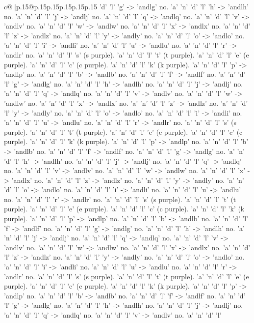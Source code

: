 \documentclass{article}
\begin{document}
{\begin{supertabular}{c@{$\;$}|p{.15\linewidth}@{}p{.15\linewidth}p{.15\linewidth}p{.15\linewidth}p{.15\linewidth}p{.15\linewidth}}
{{{'d' 'l' 'g' {-}> 'andlg' no. 'a' 'n' 'd' 'l' 'h' {-}> 'andlh' no. 'a' 'n' 'd' 'l' 'j' {-}> 'andlj' no. 'a' 'n' 'd' 'l' 'q' {-}> 'andlq' no. 'a' 'n' 'd' 'l' 'v' {-}> 'andlv' no. 'a' 'n' 'd' 'l' 'w' {-}> 'andlw' no. 'a' 'n' 'd' 'l' 'x' {-}> 'andlx' no. 'a' 'n' 'd' 'l' 'z' {-}> 'andlz' no. 'a' 'n' 'd' 'l' 'y' {-}> 'andly' no. 'a' 'n' 'd' 'l' 'o' {-}> 'andlo' no. 'a' 'n' 'd' 'l' 'i' {-}> 'andli' no. 'a' 'n' 'd' 'l' 'u' {-}> 'andlu' no. 'a' 'n' 'd' 'l' 'r' {-}> 'andlr' no. 'a' 'n' 'd' 'l' 's' (s purple). 'a' 'n' 'd' 'l' 't' (t purple). 'a' 'n' 'd' 'l' 'e' (e purple). 'a' 'n' 'd' 'l' 'c' (c purple). 'a' 'n' 'd' 'l' 'k' (k purple). 'a' 'n' 'd' 'l' 'p' {-}> 'andlp' no. 'a' 'n' 'd' 'l' 'b' {-}> 'andlb' no. 'a' 'n' 'd' 'l' 'f' {-}> 'andlf' no. 'a' 'n' 'd' 'l' 'g' {-}> 'andlg' no. 'a' 'n' 'd' 'l' 'h' {-}> 'andlh' no. 'a' 'n' 'd' 'l' 'j' {-}> 'andlj' no. 'a' 'n' 'd' 'l' 'q' {-}> 'andlq' no. 'a' 'n' 'd' 'l' 'v' {-}> 'andlv' no. 'a' 'n' 'd' 'l' 'w' {-}> 'andlw' no. 'a' 'n' 'd' 'l' 'x' {-}> 'andlx' no. 'a' 'n' 'd' 'l' 'z' {-}> 'andlz' no. 'a' 'n' 'd' 'l' 'y' {-}> 'andly' no. 'a' 'n' 'd' 'l' 'o' {-}> 'andlo' no. 'a' 'n' 'd' 'l' 'i' {-}> 'andli' no. 'a' 'n' 'd' 'l' 'u' {-}> 'andlu' no. 'a' 'n' 'd' 'l' 'r' {-}> 'andlr' no. 'a' 'n' 'd' 'l' 's' (s purple). 'a' 'n' 'd' 'l' 't' (t purple). 'a' 'n' 'd' 'l' 'e' (e purple). 'a' 'n' 'd' 'l' 'c' (c purple). 'a' 'n' 'd' 'l' 'k' (k purple). 'a' 'n' 'd' 'l' 'p' {-}> 'andlp' no. 'a' 'n' 'd' 'l' 'b' {-}> 'andlb' no. 'a' 'n' 'd' 'l' 'f' {-}> 'andlf' no. 'a' 'n' 'd' 'l' 'g' {-}> 'andlg' no. 'a' 'n' 'd' 'l' 'h' {-}> 'andlh' no. 'a' 'n' 'd' 'l' 'j' {-}> 'andlj' no. 'a' 'n' 'd' 'l' 'q' {-}> 'andlq' no. 'a' 'n' 'd' 'l' 'v' {-}> 'andlv' no. 'a' 'n' 'd' 'l' 'w' {-}> 'andlw' no. 'a' 'n' 'd' 'l' 'x' {-}> 'andlx' no. 'a' 'n' 'd' 'l' 'z' {-}> 'andlz' no. 'a' 'n' 'd' 'l' 'y' {-}> 'andly' no. 'a' 'n' 'd' 'l' 'o' {-}> 'andlo' no. 'a' 'n' 'd' 'l' 'i' {-}> 'andli' no. 'a' 'n' 'd' 'l' 'u' {-}> 'andlu' no. 'a' 'n' 'd' 'l' 'r' {-}> 'andlr' no. 'a' 'n' 'd' 'l' 's' (s purple). 'a' 'n' 'd' 'l' 't' (t purple). 'a' 'n' 'd' 'l' 'e' (e purple). 'a' 'n' 'd' 'l' 'c' (c purple). 'a' 'n' 'd' 'l' 'k' (k purple). 'a' 'n' 'd' 'l' 'p' {-}> 'andlp' no. 'a' 'n' 'd' 'l' 'b' {-}> 'andlb' no. 'a' 'n' 'd' 'l' 'f' {-}> 'andlf' no. 'a' 'n' 'd' 'l' 'g' {-}> 'andlg' no. 'a' 'n' 'd' 'l' 'h' {-}> 'andlh' no. 'a' 'n' 'd' 'l' 'j' {-}> 'andlj' no. 'a' 'n' 'd' 'l' 'q' {-}> 'andlq' no. 'a' 'n' 'd' 'l' 'v' {-}> 'andlv' no. 'a' 'n' 'd' 'l' 'w' {-}> 'andlw' no. 'a' 'n' 'd' 'l' 'x' {-}> 'andlx' no. 'a' 'n' 'd' 'l' 'z' {-}> 'andlz' no. 'a' 'n' 'd' 'l' 'y' {-}> 'andly' no. 'a' 'n' 'd' 'l' 'o' {-}> 'andlo' no. 'a' 'n' 'd' 'l' 'i' {-}> 'andli' no. 'a' 'n' 'd' 'l' 'u' {-}> 'andlu' no. 'a' 'n' 'd' 'l' 'r' {-}> 'andlr' no. 'a' 'n' 'd' 'l' 's' (s purple). 'a' 'n' 'd' 'l' 't' (t purple). 'a' 'n' 'd' 'l' 'e' (e purple). 'a' 'n' 'd' 'l' 'c' (c purple). 'a' 'n' 'd' 'l' 'k' (k purple). 'a' 'n' 'd' 'l' 'p' {-}> 'andlp' no. 'a' 'n' 'd' 'l' 'b' {-}> 'andlb' no. 'a' 'n' 'd' 'l' 'f' {-}> 'andlf' no. 'a' 'n' 'd' 'l' 'g' {-}> 'andlg' no. 'a' 'n' 'd' 'l' 'h' {-}> 'andlh' no. 'a' 'n' 'd' 'l' 'j' {-}> 'andlj' no. 'a' 'n' 'd' 'l' 'q' {-}> 'andlq' no. 'a' 'n' 'd' 'l' 'v' {-}> 'andlv' no. 'a' 'n' 'd' 'l' }}}
\end{supertabular}}
\end{document}
